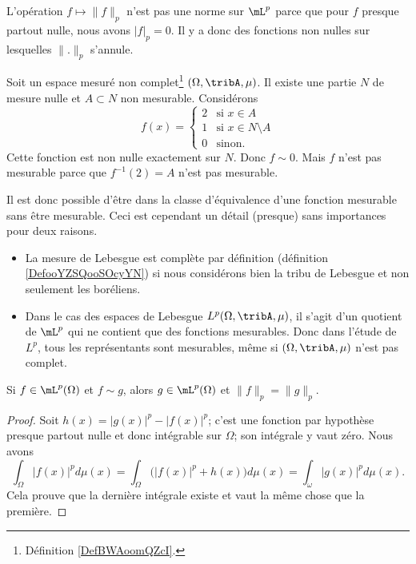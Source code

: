 \begin{normaltext}
	L'opération \( f\mapsto \| f \|_p\) n'est pas une norme sur \( \mL^p\) parce que pour \( f\) presque partout nulle, nous avons \( | f |_p=0\). Il y a donc des fonctions non nulles sur lesquelles \( \| . \|_p\) s'annule.
\end{normaltext}

\begin{normaltext}
	Soit un espace mesuré non complet\footnote{Définition \ref{DefBWAoomQZcI}.} \( (\Omega,\tribA,\mu)\). Il existe une partie \( N\) de mesure nulle et \( A\subset N\) non mesurable. Considérons
	\begin{equation}
		f(x)=\begin{cases}
			2 & \text{si } x\in A            \\
			1 & \text{si } x\in N\setminus A \\
			0 & \text{sinon. }
		\end{cases}
	\end{equation}
	Cette fonction est non nulle exactement sur \( N\). Donc \( f\sim 0\). Mais \( f\) n'est pas mesurable parce que \( f^{-1}(2)=A\) n'est pas mesurable.

	Il est donc possible d'être dans la classe d'équivalence d'une fonction mesurable sans être mesurable. Ceci est cependant un détail (presque) sans importances pour deux raisons.
	\begin{itemize}
		\item La mesure de Lebesgue est complète par définition (définition \ref{DefooYZSQooSOcyYN}) si nous considérons bien la tribu de Lebesgue et non seulement les boréliens.
		\item Dans le cas des espaces de Lebesgue \( L^p(\Omega,\tribA,\mu)\), il s'agit d'un quotient de \( \mL^p\) qui ne contient que des fonctions mesurables. Donc dans l'étude de \( L^p\), tous les représentants sont mesurables, même si \( (\Omega,\tribA,\mu)\) n'est pas complet.
	\end{itemize}
\end{normaltext}

\begin{lemma}       \label{LemKZVHVAR}
	Si \( f\in \mL^p(\Omega)\) et \( f\sim g\), alors \( g\in \mL^p(\Omega)\) et \( \| f \|_p=\| g \|_p\).
\end{lemma}

\begin{proof}
	Soit \( h(x)=| g(x) |^p-| f(x) |^p\); c'est une fonction par hypothèse presque partout nulle et donc intégrable sur \( \Omega\); son intégrale y vaut zéro. Nous avons
	\begin{equation}
		\int_{\Omega}| f(x) |^pd\mu(x)=\int_{\Omega}\Big( | f(x) |^p+h(x)\big)d\mu(x)=\int_{\omega}| g(x) |^pd\mu(x).
	\end{equation}
	Cela prouve que la dernière intégrale existe et vaut la même chose que la première.
\end{proof}

